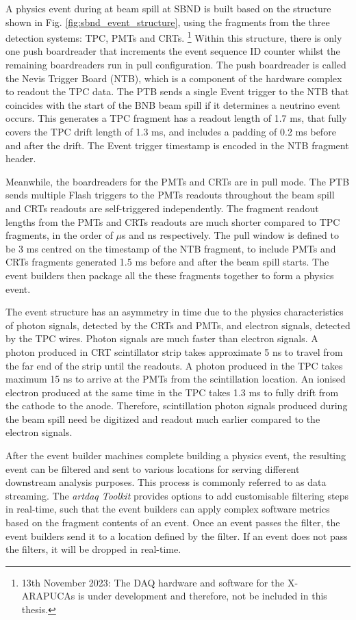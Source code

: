 A physics event during at beam spill at SBND is built based on the structure shown in Fig. \ref{fig:sbnd_event_structure}, using the fragments from the three detection systems: TPC, PMTs and CRTs.
\footnote{13th November 2023: The DAQ hardware and software for the X-ARAPUCAs is under development and therefore, not be included in this thesis. }
Within this structure, there is only one push boardreader that increments the event sequence ID counter whilst the remaining boardreaders run in pull configuration.
The push boardreader is called the Nevis Trigger Board (NTB), which is a component of the hardware complex to readout the TPC data. 
The PTB sends a single Event trigger to the NTB that coincides with the start of the BNB beam spill if it determines a neutrino event occurs.
This generates a TPC fragment has a readout length of 1.7 ms, that fully covers the TPC drift length of 1.3 ms, and includes a padding of 0.2 ms before and after the drift.
The Event trigger timestamp is encoded in the NTB fragment header.

Meanwhile, the boardreaders for the PMTs and CRTs are in pull mode.
The PTB sends multiple Flash triggers to the PMTs readouts throughout the beam spill and CRTs readouts are self-triggered independently.
The fragment readout lengths from the PMTs and CRTs readouts are much shorter compared to TPC fragments, in the order of $\mu$s and ns respectively.
The pull window is defined to be 3 ms centred on the timestamp of the NTB fragment, to include PMTs and CRTs fragments generated 1.5 ms before and after the beam spill starts.
The event builders then package all the these fragments together to form a physics event.

The event structure has an asymmetry in time due to the physics characteristics of photon signals, detected by the CRTs and PMTs, and electron signals, detected by the TPC wires.
Photon signals are much faster than electron signals.
A photon produced in CRT scintillator strip takes approximate 5 ns to travel from the far end of the strip until the readouts.
A photon produced in the TPC takes maximum 15 ns to arrive at the PMTs from the scintillation location.
An ionised electron produced at the same time in the TPC takes 1.3 ms to fully drift from the cathode to the anode.
Therefore, scintillation photon signals produced during the beam spill need be digitized and readout much earlier compared to the electron signals.

After the event builder machines complete building a physics event, the resulting event can be filtered and sent to various locations for serving different downstream analysis purposes. 
This process is commonly referred to as data streaming.
The \textit{artdaq Toolkit} provides options to add customisable filtering steps in real-time, such that the event builders can apply complex software metrics based on the fragment contents of an event.
Once an event passes the filter, the event builders send it to a location defined by the filter.
If an event does not pass the filters, it will be dropped in real-time.


